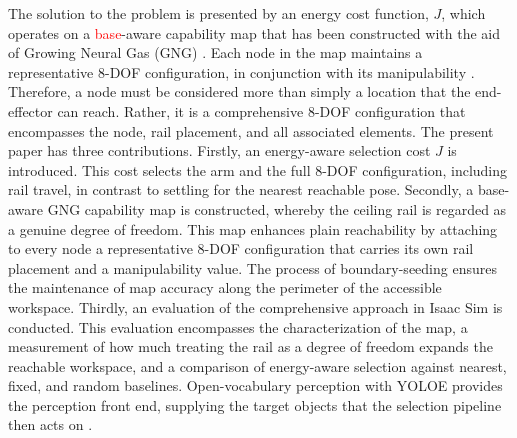 \documentclass[conference]{IEEEtran}
\begin{document}
The solution to the problem is presented by an energy cost function, $J$, 
which operates on a \textcolor{red}{base}-aware capability map that has been constructed
with the aid of Growing Neural Gas (GNG) \cite{Fritzke1995}. Each node in 
the map maintains a representative 8-DOF configuration, in conjunction 
with its manipulability \cite{Yoshikawa1985}. Therefore, a node must be considered more than simply 
a location that the end-effector can reach. Rather, it is a comprehensive 8-DOF 
configuration that encompasses the node, rail placement, and all associated elements.
The present paper has three contributions. Firstly, an energy-aware selection 
cost $J$ is introduced. This cost selects the arm and the full 8-DOF configuration, 
including rail travel, in contrast to settling for the nearest reachable pose. 
Secondly, a base-aware GNG capability map is constructed, whereby 
the ceiling rail is regarded as a genuine degree of freedom. 
This map enhances plain reachability by attaching to every node 
a representative 8-DOF configuration that carries its own rail placement
and a manipulability value. The process of boundary-seeding
ensures the maintenance of map accuracy along the perimeter of the accessible workspace. 
Thirdly, an evaluation of the comprehensive approach in Isaac Sim is conducted. 
This evaluation encompasses the characterization of the map, a measurement of 
how much treating the rail as a degree of freedom expands the reachable workspace, 
and a comparison of energy-aware selection against nearest, fixed, and random baselines.
Open-vocabulary perception with YOLOE provides the perception front end, supplying the target objects
that the selection pipeline then acts on \cite{Wang2025}.
\end{document}
